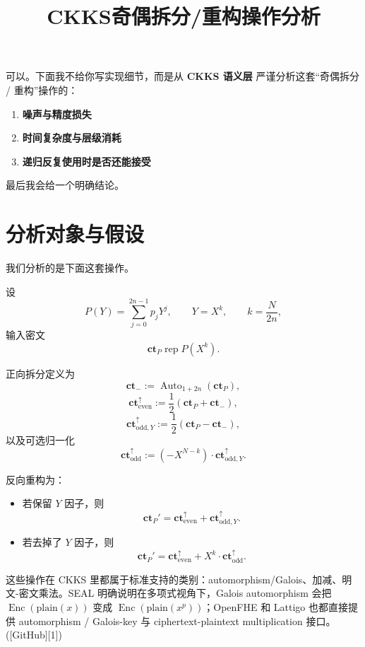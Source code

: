 \documentclass{article}
\title{CKKS奇偶拆分/重构操作分析}
\author{}
\date{}
\newcommand{\Auto}{\operatorname{Auto}}
\newcommand{\rep}{\operatorname{rep}}
\newcommand{\ct}{\mathbf{ct}}
\begin{document}
\maketitle






\tableofcontents
\newpage

可以。下面我不给你写实现细节，而是从 \textbf{CKKS 语义层} 严谨分析这套“奇偶拆分 / 重构”操作的：

\begin{enumerate}
    \item \textbf{噪声与精度损失}
    \item \textbf{时间复杂度与层级消耗}
    \item \textbf{递归反复使用时是否还能接受}
\end{enumerate}

最后我会给一个明确结论。

\section{分析对象与假设}

我们分析的是下面这套操作。

设
\[
P(Y)=\sum_{j=0}^{2n-1}p_jY^j,\qquad Y=X^k,\qquad k=\frac{N}{2n},
\]
输入密文
\[
\ct_P \rep P(X^k).
\]

正向拆分定义为
\[
\ct_{-}:=\Auto_{1+2n}(\ct_P),
\]
\[
\ct_{\mathrm{even}}^{\uparrow}:=\frac12(\ct_P+\ct_{-}),
\]
\[
\ct_{\mathrm{odd},Y}^{\uparrow}:=\frac12(\ct_P-\ct_{-}),
\]
以及可选归一化
\[
\ct_{\mathrm{odd}}^{\uparrow}:=(-X^{N-k})\cdot \ct_{\mathrm{odd},Y}^{\uparrow}.
\]

反向重构为：

\begin{itemize}
    \item 若保留 \(Y\) 因子，则
    \[
    \ct_{P}'=\ct_{\mathrm{even}}^{\uparrow}+\ct_{\mathrm{odd},Y}^{\uparrow}.
    \]
    \item 若去掉了 \(Y\) 因子，则
    \[
    \ct_{P}'=\ct_{\mathrm{even}}^{\uparrow}+X^k\cdot \ct_{\mathrm{odd}}^{\uparrow}.
    \]
\end{itemize}

这些操作在 CKKS 里都属于标准支持的类别：automorphism/Galois、加减、明文-密文乘法。SEAL 明确说明在多项式视角下，Galois automorphism 会把 \( \operatorname{Enc}(\text{plain}(x)) \) 变成 \( \operatorname{Enc}(\text{plain}(x^p)) \)；OpenFHE 和 Lattigo 也都直接提供 automorphism / Galois-key 与 ciphertext-plaintext multiplication 接口。([GitHub][1])
\end{document}
